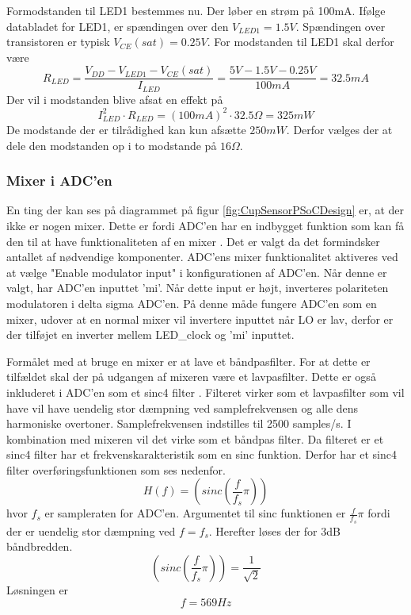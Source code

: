 \documentclass[HardwareDesign/HardwareDesign_main.tex]{subfiles}
\begin{document}
Formodstanden til LED1 bestemmes nu. Der løber en strøm på 100mA. Ifølge databladet for LED1, er spændingen over den $V_{LED1} = 1.5\si{V}$. Spændingen over transistoren er typisk $V_{CE}(sat) = 0.25\si{V}$. For modstanden til LED1 skal derfor være 
$$R_{LED} = \frac{V_{DD} - V_{LED1} - V_{CE}(sat)}{I_{LED}} = \frac{5\si{V}- 1.5\si{V} - 0.25\si{V}}{100\si{mA}} = 32.5\si{mA}$$
Der vil i modstanden blive afsat en effekt på $$I_{LED}^2 \cdot R_{LED} = \left(100\si{mA}\right)^2 \cdot 32.5\si{\Omega} = 325\si{mW}$$
De modstande der er tilrådighed kan kun afsætte $250\si{mW}$. Derfor vælges der at dele den modstanden op i to modstande på $16\si{\Omega}$.

\subsubsection{Mixer i ADC'en}
En ting der kan ses på diagrammet på figur \ref{fig:CupSensorPSoCDesign} er, at der ikke er nogen mixer. Dette er fordi ADC'en har en indbygget funktion som kan få den til at have funktionaliteten af en mixer \autocite[3]{ADC-DelSig-datasheet}. Det er valgt da det formindsker antallet af nødvendige komponenter. ADC'ens mixer funktionalitet aktiveres ved at vælge "Enable modulator input" i konfigurationen af ADC'en. Når denne er valgt, har ADC'en inputtet 'mi'. Når dette input er højt, inverteres polariteten modulatoren i delta sigma ADC'en. På denne måde fungere ADC'en som en mixer, udover at en normal mixer vil invertere inputtet når LO er lav, derfor er der tilføjet en inverter mellem LED\_clock og 'mi' inputtet.

Formålet med at bruge en mixer er at lave et båndpasfilter. For at dette er tilfældet skal der på udgangen af mixeren være et lavpasfilter. Dette er også inkluderet i ADC'en som et sinc4 filter \autocite[35]{ADC-DelSig-datasheet}. Filteret virker som et lavpasfilter som vil have vil have uendelig stor dæmpning ved samplefrekvensen og alle dens harmoniske overtoner. Samplefrekvensen indstilles til 2500 samples/s. I kombination med mixeren vil det virke som et båndpas filter. Da filteret er et sinc4 filter har et frekvenskarakteristik som en sinc funktion. Derfor har et sinc4 filter overføringsfunktionen som ses nedenfor.
$$H(f) = \left(sinc\left( \frac{f}{f_s}\pi\right)\right)$$
hvor $f_s$ er sampleraten for ADC'en.
Argumentet til sinc funktionen er $\frac{f}{f_s}\pi$ fordi der er uendelig stor dæmpning ved $f=f_s$.
Herefter løses der for 3dB båndbredden.
$$\left(sinc\left( \frac{f}{f_s}\pi\right)\right) = \frac{1}{\sqrt{2}}$$
Løsningen er
$$f = 569\si{Hz}$$
\end{document}
